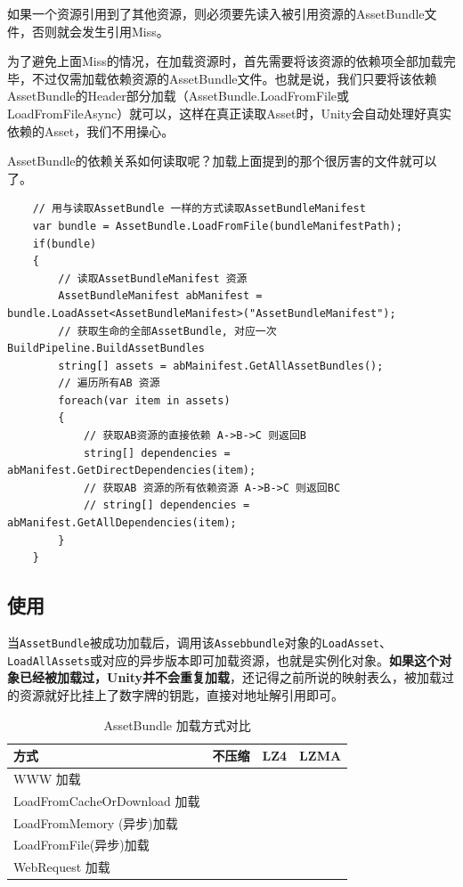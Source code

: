 \documentclass[UTF8,a4paper,12pt]{ctexbook}
\begin{document}
			如果一个资源引用到了其他资源，则必须要先读入被引用资源的AssetBundle文件，否则就会发生引用Miss。
			
			为了避免上面Miss的情况，在加载资源时，首先需要将该资源的依赖项全部加载完毕，不过仅需加载依赖资源的AssetBundle文件。也就是说，我们只要将该依赖AssetBundle的Header部分加载（AssetBundle.LoadFromFile或LoadFromFileAsync）就可以，这样在真正读取Asset时，Unity会自动处理好真实依赖的Asset，我们不用操心。
			
			AssetBundle的依赖关系如何读取呢？加载上面提到的那个很厉害的文件就可以了。
				\begin{lstlisting}
	// 用与读取AssetBundle 一样的方式读取AssetBundleManifest
	var bundle = AssetBundle.LoadFromFile(bundleManifestPath);
	if(bundle)
	{
		// 读取AssetBundleManifest 资源
		AssetBundleManifest abManifest = bundle.LoadAsset<AssetBundleManifest>("AssetBundleManifest");
		// 获取生命的全部AssetBundle, 对应一次BuildPipeline.BuildAssetBundles
		string[] assets = abMainifest.GetAllAssetBundles();
		// 遍历所有AB 资源
		foreach(var item in assets)
		{
			// 获取AB资源的直接依赖 A->B->C 则返回B
			string[] dependencies = abManifest.GetDirectDependencies(item);
			// 获取AB 资源的所有依赖资源 A->B->C 则返回BC
			// string[] dependencies = abManifest.GetAllDependencies(item);
		}
	}
				\end{lstlisting}
		\subsection{使用}
			当\verb|AssetBundle|被成功加载后，调用该\verb|Assebbundle|对象的\verb|LoadAsset|、\verb|LoadAllAssets|或对应的异步版本即可加载资源，也就是实例化对象。\textbf{如果这个对象已经被加载过，Unity并不会重复加载}，还记得之前所说的映射表么，被加载过的资源就好比挂上了数字牌的钥匙，直接对地址解引用即可。
			
			\begin{table}
				\centering
				\caption{AssetBundle 加载方式对比}
				\begin{tabular}{p{5cm}<{\centering}|p{3cm}<{\centering}|p{3cm}<{\centering}|p{3cm}<{\centering}}
					\toprule
						方式 & 不压缩 & LZ4 & LZMA\\
					\midrule
						WWW 加载 & & & \\
						LoadFromCacheOrDownload 加载 & & & \\
						LoadFromMemory (异步)加载 & & & \\
						LoadFromFile(异步)加载 & & & \\
						WebRequest 加载 & & & \\
					\bottomrule
				\end{tabular}
			\end{table}
\end{document}
